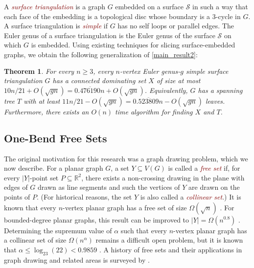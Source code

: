 \documentclass[11pt]{article}
\newcommand{\R}{\mathbb{R}}
\newtheorem{thm}{Theorem}
\newcommand{\defin}[1]{\emph{\textcolor{Maroon}{#1}}}
\theoremstyle{definition}
\begin{document}
A \defin{surface triangulation} is a graph $G$ embedded on a surface $\mathcal{S}$ in such a way that each face of the embedding is a topological disc whose boundary is a $3$-cycle in $G$.  A surface triangulation is \defin{simple} if $G$ has no self loops or parallel edges. The Euler genus of a surface triangulation is the Euler genus of the surface $\mathcal{S}$ on which $G$ is embedded.  Using existing techniques for slicing surface-embedded graphs, we obtain the following generalization of \cref{main_result2}:

\begin{thm}\label{genus_result}
  For every $n\ge 3$, every $n$-vertex Euler genus-$g$ simple surface triangulation $G$ has a connected dominating set $X$ of size at most $10n/21 +O(\sqrt{gn})= 0.\overline{476190}n + O(\sqrt{gn})$.  Equivalently, $G$ has a spanning tree $T$ with at least $11n/21 -O(\sqrt{gn})=0.\overline{523809}n-O(\sqrt{gn})$ leaves.  Furthermore, there exists an $O(n)$ time algorithm for finding $X$ and $T$.
\end{thm}



\subsection{One-Bend Free Sets}

The original motivation for this research was a graph drawing problem, which we now describe.  For a planar graph $G$, a set $Y\subseteq V(G)$ is called a \defin{free set} if, for every $|Y|$-point set $P\subseteq\R^2$, there exists a non-crossing drawing in the plane with edges of $G$ drawn as line segments and such the vertices of $Y$ are drawn on the points of $P$.  (For historical reasons, the set $Y$ is also called a \defin{collinear set}.)  It is known that every $n$-vertex planar graph has a free set of size $\Omega(\sqrt{n})$ \cite{bose.dujmovic:polynomial,dujmovic:utility,dujmovic.frati.ea:every}.
For bounded-degree planar graphs, this result can be improved to $|Y|=\Omega(n^{0.8})$ \cite{dujmovic.morin:dual}.  Determining the supremum value of $\alpha$ such that every $n$-vertex planar graph has a collinear set of size $\Omega(n^{\alpha})$ remains a difficult open problem, but it is known that $\alpha \le \log_{23}(22)<0.9859$ \cite{ravsky.verbitsky:collinear}. A history of free sets and their applications in graph drawing and related areas is surveyed by \citet{dujmovic.morin:free}.
\end{document}
